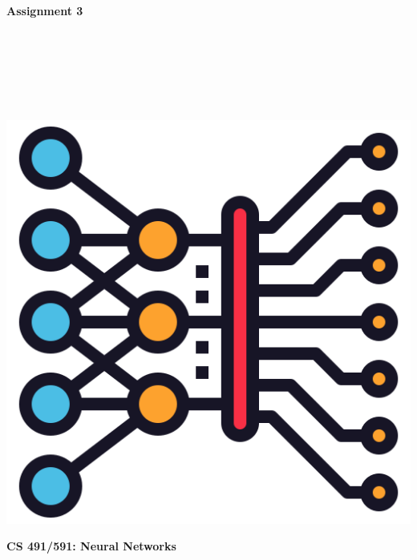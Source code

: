 \documentclass{article}
\begin{document}
\begin{titlepage}
\begin{center}
\vspace*{1cm}
            
\Huge
\textbf{Assignment 3}
            
\vspace{1cm}

\Large
{}

\vspace{2cm}

 \\
 \\
 \\
 \\
 \\

\vspace{2cm}

\includegraphics[scale=0.25]{../figs/icon.png}\\[0.5cm]

\vspace{9cm}

\textbf{CS 491/591: Neural Networks} \\

\end{center}
\end{titlepage}
\end{document}
